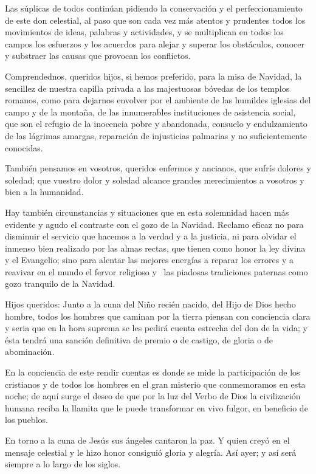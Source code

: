 Las súplicas de todos continúan pidiendo la conservación y el
perfeccionamiento de este don celestial, al paso que son cada vez más
atentos y prudentes todos los movimientos de ideas, palabras y
actividades, y se multiplican en todos los campos los esfuerzos y los
acuerdos para alejar y superar los obstáculos, conocer y substraer las
causas que provocan los conflictos.

Comprendednos, queridos hijos, si hemos preferido, para la misa de
Navidad, la sencillez de nuestra capilla privada a las majestuosas
bóvedas de los templos romanos, como para dejarnos envolver por el
ambiente de las humildes iglesias del campo y de la montaña, de las
innumerables instituciones de asistencia social, que son el refugio de
la inocencia pobre y abandonada, consuelo y endulzamiento de las
lágrimas amargas, reparación de injusticias palmarias y no
suficientemente conocidas.

También pensamos en vosotros, queridos enfermos y ancianos, que sufrís
dolores y soledad; que vuestro dolor y soledad alcance grandes
merecimientos a vosotros y bien a la humanidad.

Hay también circunstancias y situaciones que en esta solemnidad hacen
más evidente y agudo el contraste con el gozo de la Navidad. Reclamo
eficaz no para disminuir el servicio que hacemos a la verdad y a la
justicia, ni para olvidar el inmenso bien realizado por las almas
rectas, que tienen como honor la ley divina y el Evangelio; sino para
alentar las mejores energías a reparar los errores y a reavivar en el
mundo el fervor religioso y~ las piadosas tradiciones paternas como gozo
tranquilo de la Navidad.

Hijos queridos: Junto a la cuna del Niño recién nacido, del Hijo de Dios
hecho hombre, todos los hombres que caminan por la tierra piensan con
conciencia clara y seria que en la hora suprema se les pedirá cuenta
estrecha del don de la vida; y ésta tendrá una sanción definitiva de
premio o de castigo, de gloria o de abominación.

En la conciencia de este rendir cuentas es donde se mide la
participación de los cristianos y de todos los hombres en el gran
misterio que conmemoramos en esta noche; de aquí surge el deseo de que
por la luz del Verbo de Dios la civilización humana reciba la llamita
que le puede transformar en vivo fulgor, en beneficio de los pueblos.

En torno a la cuna de Jesús sus ángeles cantaron la paz. Y quien creyó
en el mensaje celestial y le hizo honor consiguió gloria y alegría. Así
ayer; y así será siempre a lo largo de los siglos.

